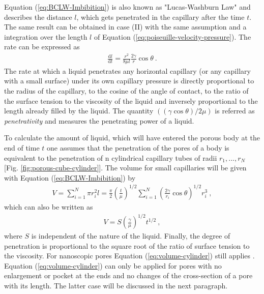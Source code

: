 \documentclass[aip, amsmath, amssymb, reprint, twocolumn, floatfix]{revtex4-1}
\newcommand{\dldt}{\frac{\mathrm{d}l}{\mathrm{d}t}}
\begin{document}
Equation (\ref{eq:BCLW-Imbibition}) is also known as "Lucas-Washburn Law" and describes the distance $l$, which gets penetrated in the capillary after the time $t$. The same result can be obtained in case (II) with the same assumption and a integration over the length $l$ of Equation (\ref{eq:poiseuille-velocity-pressure}). The rate can be expressed as
\begin{gather}
	\boxed{\dldt = \frac{r^2}{8\mu l} \frac{2\gamma}{r} \cos \theta}~.
	\label{eq:rate}
\end{gather}
The rate at which a liquid penetrates any horizontal capillary (or any capillary with a small surface) under its own capillary pressure is directly proportional to the radius of the capillary, to the cosine of the angle of contact, to the ratio of the surface tension to the viscosity of the liquid and inversely proportional to the length already filled by the liquid. The quantity $((\gamma \cos \theta)/2 \mu)$ is referred as \textit{penetrativity} and measures the penetrating power of a liquid. 
\bigskip

\begin{center}
	\captionsetup{type=figure}
	
	\label{fig:porous-cube-cylinder}
\end{center}

To calculate the amount of liquid, which will have entered the porous body at the end of time $t$ one assumes that the penetration of the pores of a body is equivalent to the penetration of n cylindrical capillary tubes of radii ${r_1,...,r_N}$ [Fig. \ref{fig:porous-cube-cylinder}]. The volume for small capillaries will be given with Equation (\ref{eq:BCLW-Imbibition}) by
\begin{gather}
	V = \sum_{i=1}^N \pi r_i^2 l = \frac{\pi}{2} \left(\frac{t}{\mu}\right)^{1/2} \sum_{i=1}^N \left(\frac{2 \gamma}{r_i}\cos\theta \right)^{1/2} r_i^3~,
\end{gather}
which can also be written as
\begin{gather}
	\boxed{V = S \left(\frac{\gamma}{\mu}\right)^{1/2} t^{1/2}}~, 
	\label{eq:volume-cylinder}
\end{gather}
where $S$ is independent of the nature of the liquid. Finally, the degree of penetration is proportional to the square root of the ratio of surface tension to the viscosity. For nanoscopic pores Equation (\ref{eq:volume-cylinder}) still applies \cite{Dimitrov2007,Gruener2009a,Gruener2009b}. Equation (\ref{eq:volume-cylinder}) can only be applied for pores with no enlargement or pocket at the ends and no changes of the cross-section of a pore with its length. The latter case will be discussed in the next paragraph.
\end{document}
